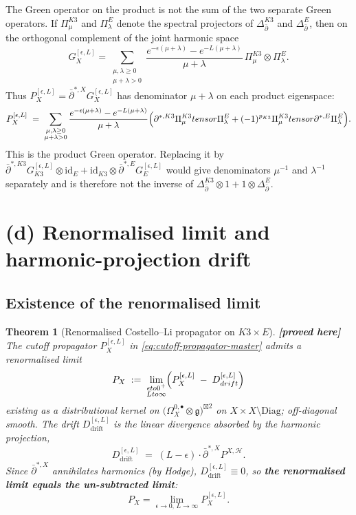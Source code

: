 \documentclass[11pt]{amsart}
\providecommand{\ClaimStatusProvedHere}[1][]{\textbf{[proved here]}}
\providecommand{\dbar}{\bar\partial}
\providecommand{\frakg}{\mathfrak{g}}
\providecommand{\Diag}{\mathrm{Diag}}
\newtheorem{theorem}{Theorem}[section]
\theoremstyle{definition}
\theoremstyle{remark}
\begin{document}
The Green operator on the product is not the sum of the two separate
Green operators. If
$\Pi^{K3}_{\mu}$ and $\Pi^E_{\lambda}$ denote the spectral projectors
of $\Delta_{\dbar}^{K3}$ and $\Delta_{\dbar}^E$, then on the orthogonal
complement of the joint harmonic space
\begin{equation}
  \label{eq:product-green-denominator-sum}
  G_X^{[\epsilon,L]}
  =
  \sum_{\substack{\mu,\lambda\geq0\\ \mu+\lambda>0}}
  \frac{e^{-\epsilon(\mu+\lambda)}-e^{-L(\mu+\lambda)}}{\mu+\lambda}\,
  \Pi^{K3}_{\mu}\otimes\Pi^E_{\lambda}.
\end{equation}
Thus $P_X^{[\epsilon,L]}=\dbar^{*,X}G_X^{[\epsilon,L]}$ has denominator
$\mu+\lambda$ on each product eigenspace:
\[
  P_X^{[\epsilon,L]}
  \;=\;
  \sum_{\substack{\mu,\lambda\geq0\\ \mu+\lambda>0}}
  \frac{e^{-\epsilon(\mu+\lambda)}-e^{-L(\mu+\lambda)}}{\mu+\lambda}
  \Bigl(
    \dbar^{*,K3}\Pi^{K3}_{\mu}\otimes\Pi^E_{\lambda}
    +(-1)^{p_{K3}}\Pi^{K3}_{\mu}\otimes\dbar^{*,E}\Pi^E_{\lambda}
  \Bigr).
\]
This is the product Green operator. Replacing it by
$\dbar^{*,K3}G_{K3}^{[\epsilon,L]}\otimes \mathrm{id}_E+
\mathrm{id}_{K3}\otimes\dbar^{*,E}G_E^{[\epsilon,L]}$ would give
denominators $\mu^{-1}$ and $\lambda^{-1}$ separately and is therefore
not the inverse of $\Delta_{\dbar}^{K3}\otimes1+1\otimes\Delta_{\dbar}^E$.

\section{(d) Renormalised limit and harmonic-projection drift}
\label{sec:renormalised-and-drift}

\subsection{Existence of the renormalised limit}

\begin{theorem}[Renormalised Costello--Li propagator on $K3 \times E$]
\label{thm:renorm-propagator}
\ClaimStatusProvedHere
The cutoff propagator $P_X^{[\epsilon,L]}$ in
\eqref{eq:cutoff-propagator-master} admits a renormalised limit
\begin{equation}
  \label{eq:renormalised-limit-explicit}
  P_X
  \;:=\;
  \lim_{\substack{\epsilon \to 0^+ \\ L \to \infty}}
  \Bigl(
  P_X^{[\epsilon,L]} \;-\; D_{\mathrm{drift}}^{[\epsilon,L]}
  \Bigr)
\end{equation}
existing as a distributional kernel on
$\bigl(\Omega^{0,\bullet}_X \otimes \frakg\bigr)^{\boxtimes 2}$
on $X \times X \setminus \Diag$; off-diagonal smooth.
The drift $D_{\mathrm{drift}}^{[\epsilon,L]}$ is the linear
divergence absorbed by the harmonic projection,
\[
  D_{\mathrm{drift}}^{[\epsilon,L]}
  \;=\;
  (L - \epsilon)\cdot \dbar^{*,X} P^{X,\mathcal H}.
\]
Since $\dbar^{*,X}$ annihilates harmonics (by Hodge),
$D_{\mathrm{drift}}^{[\epsilon,L]} \equiv 0$, so
\textbf{the renormalised limit equals the un-subtracted limit}:
\[
  P_X = \lim_{\epsilon \to 0,\, L \to \infty} P_X^{[\epsilon,L]}.
\]
\end{theorem}
\end{document}
